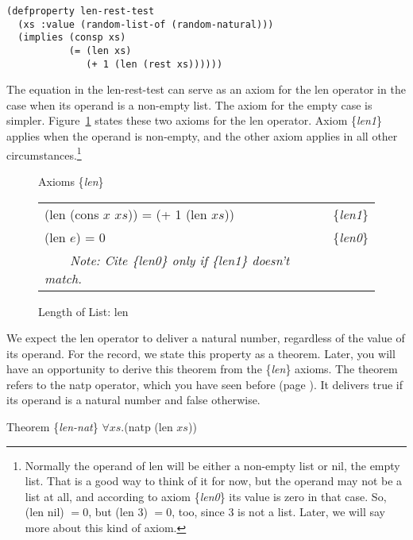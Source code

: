 \begin{Verbatim}
(defproperty len-rest-test
  (xs :value (random-list-of (random-natural)))
  (implies (consp xs)
           (= (len xs)
              (+ 1 (len (rest xs))))))
\end{Verbatim}

The equation in the len-rest-test can serve
as an axiom for the len operator in the case
when its operand is a non-empty list.
The axiom for the empty case is simpler.
Figure~\ref{fig:len-axioms} states these two axioms for
the len operator. Axiom \{\emph{len1}\} applies when
the operand is non-empty, and the other axiom
applies in all other circumstances.\footnote{Normally
the operand of len will be either a non-empty list or nil, the empty list.
That is a good way to think of it for now,
but the operand may not be a list at all,
and according to axiom \{\emph{len0}\} its value is zero in that case.
So, (len nil) $= 0$, but (len $3$) $= 0$, too, since
$3$ is not a list. Later, we will say more about this kind of axiom.}

\begin{figure}
\begin{center}
Axioms \{\emph{len}\} \\
\begin{tabular}{ll}
(len (cons $x$ $xs$)) = (+ 1 (len $xs$)) & \{\emph{len1}\} \\
(len $e$) = 0                            & \{\emph{len0}\} \\
~~~~\emph{Note: Cite \{\emph{len0}\} only if \{\emph{len1}\} doesn't match.}&\\
\end{tabular}
\end{center}
\caption{Length of List: len}
\label{len-equations}
\label{fig:len-axioms}
\end{figure}

We expect the len operator to deliver a natural number,
regardless of the value of its operand.
For the record, we state this property as a theorem.
Later, you will have an opportunity to derive
this theorem from the \{\emph{len}\} axioms.
The theorem refers to the natp operator,
which you have seen before (page \pageref{natp-op}).
It delivers true if its operand is a natural number and false otherwise.
\begin{samepage}
\label{len-nat-thm}
\begin{center}
Theorem \{\emph{len-nat}\} $\forall xs.$(natp (len $xs$))
\end{center}
\end{samepage}

